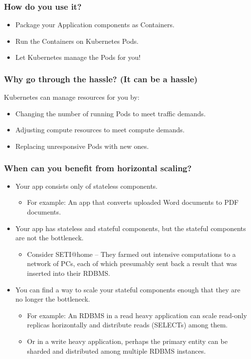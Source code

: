     \begin{frame}
        \frametitle{How do you use it?}
        \begin{itemize}
            \item{Package your Application components as Containers.}\pause
            \item{Run the Containers on Kubernetes Pods.}\pause
            \item{Let Kubernetes manage the Pods for you!}
        \end{itemize}
    \end{frame}

    \begin{frame}
        \frametitle{Why go through the hassle? (It can be a hassle)}
        Kubernetes can manage resources for you by:\pause
        \begin{itemize}
            \item{Changing the number of running Pods to meet traffic demands.}\pause
            \item{Adjusting compute resources to meet compute demands.}\pause
            \item{Replacing unresponsive Pods with new ones.}
        \end{itemize}
    \end{frame}

    \begin{frame}
        \frametitle{When can you benefit from horizontal scaling?}
        \begin{itemize}
            \item{Your app consists only of stateless components.}\pause
            \begin{itemize}
                \item{For example: An app that converts uploaded Word documents to PDF documents.}\pause
            \end{itemize}
            \item{Your app has stateless and stateful components, but the stateful components are not the bottleneck.}\pause
            \begin{itemize}
                \item{Consider SETI@home -- They farmed out intensive computations to a network of PCs, each of which presumably sent back a result that was inserted into their RDBMS.}\pause
            \end{itemize}
            \item{You can find a way to scale your stateful components enough that they are no longer the bottleneck.}\pause
            \begin{itemize}
                \item{For example: An RDBMS in a read heavy application can scale read-only replicas horizontally and distribute reads (SELECTs) among them.}\pause
                \item{Or in a write heavy application, perhaps the primary entity can be sharded and distributed among multiple RDBMS instances.}
            \end{itemize}
        \end{itemize}
    \end{frame}

